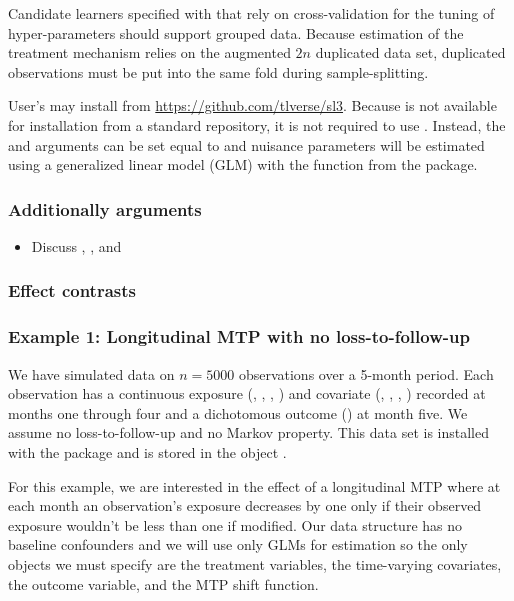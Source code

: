\documentclass[]{jss}
\providecommand{\tightlist}{%
  \setlength{\itemsep}{0pt}\setlength{\parskip}{0pt}}
\begin{document}
Candidate learners specified with  that rely on cross-validation
for the tuning of hyper-parameters should support grouped data. Because
estimation of the treatment mechanism relies on the augmented \(2n\) duplicated
data set, duplicated observations must be put into the same fold during sample-splitting. 

User's may install  from \url{https://github.com/tlverse/sl3}.
Because  is not available for installation from a standard
repository, it is not required to use . Instead, the  and 
 arguments can be set equal to
 and nuisance parameters will be estimated using a
generalized linear model (GLM) with the  function from the
 package.

\hypertarget{additionally-arguments}{%
\subsubsection{Additionally arguments}\label{additionally-arguments}}

\begin{itemize}
\tightlist
\item
  Discuss , , and 
\end{itemize}

\hypertarget{effect-contrasts}{%
\subsubsection{Effect contrasts}\label{effect-contrasts}}

\hypertarget{example-1-longitudinal-mtp-with-no-loss-to-follow-up}{%
\subsubsection{Example 1: Longitudinal MTP with no
loss-to-follow-up}\label{example-1-longitudinal-mtp-with-no-loss-to-follow-up}}

We have simulated data on \(n = 5000\) observations over a 5-month
period. Each observation has a continuous exposure (,
, , ) and covariate (,
, , ) recorded at months one through four
and a dichotomous outcome () at month five. We assume no
loss-to-follow-up and no Markov property. This data set is installed
with the package and is stored in the object .

For this example, we are interested in the effect of a longitudinal MTP
where at each month an observation's exposure decreases by one only if
their observed exposure wouldn't be less than one if modified. Our data
structure has no baseline confounders and we will use only GLMs for
estimation so the only objects we must specify are the treatment
variables, the time-varying covariates, the outcome variable, and the
MTP shift function.
\end{document}

